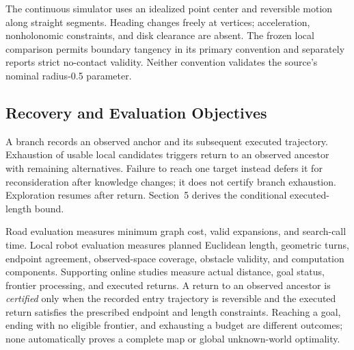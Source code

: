 The continuous simulator uses an idealized point center and reversible motion along straight segments. Heading changes freely at vertices; acceleration, nonholonomic constraints, and disk clearance are absent. The frozen local comparison permits boundary tangency in its primary convention and separately reports strict no-contact validity. Neither convention validates the source's nominal radius-0.5 parameter.

\subsection{Recovery and Evaluation Objectives}
A branch records an observed anchor and its subsequent executed trajectory. Exhaustion of usable local candidates triggers return to an observed ancestor with remaining alternatives. Failure to reach one target instead defers it for reconsideration after knowledge changes; it does not certify branch exhaustion. Exploration resumes after return. Section~5 derives the conditional executed-length bound.

Road evaluation measures minimum graph cost, valid expansions, and search-call time. Local robot evaluation measures planned Euclidean length, geometric turns, endpoint agreement, observed-space coverage, obstacle validity, and computation components. Supporting online studies measure actual distance, goal status, frontier processing, and executed returns. A return to an observed ancestor is \emph{certified} only when the recorded entry trajectory is reversible and the executed return satisfies the prescribed endpoint and length constraints. Reaching a goal, ending with no eligible frontier, and exhausting a budget are different outcomes; none automatically proves a complete map or global unknown-world optimality.
